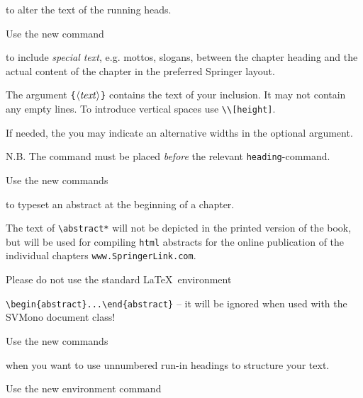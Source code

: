\documentclass[graybox,square]{svmono}
\begin{document}
\begin{sloppy}
to alter the text of the running heads.

Use the new command
\cprotect{}

to include {\it special text}, e.g. mottos, slogans, between the chapter heading and the actual content of the chapter in the preferred Springer layout.

The argument \verb|{|$\langle {\it text}\rangle$\verb|}| contains the text of your inclusion. It may not contain any empty lines. To introduce vertical spaces use \verb|\\[height]|.

If needed, the you may indicate an alternative widths in the optional argument.

N.B. The command must be placed {\it before} the relevant \verb|heading|-command.

Use the new commands

\cprotect{}

to typeset an abstract at the beginning of a chapter.

The text of \verb|\abstract*| will not be depicted in the printed version of the book, but will be used for compiling \verb|html| abstracts for the online publication of the individual chapters \verb|www.SpringerLink.com|.

Please do not use the standard \LaTeX\ environment 

\verb|\begin{abstract}...\end{abstract}| -- it will be ignored when used with the {\sc SVMono} document class!

\pagebreak

Use the new commands

\cprotect{}

when you want to use unnumbered run-in headings to structure your text.


Use the new environment command
\cprotect{}


\end{sloppy}
\end{document}
